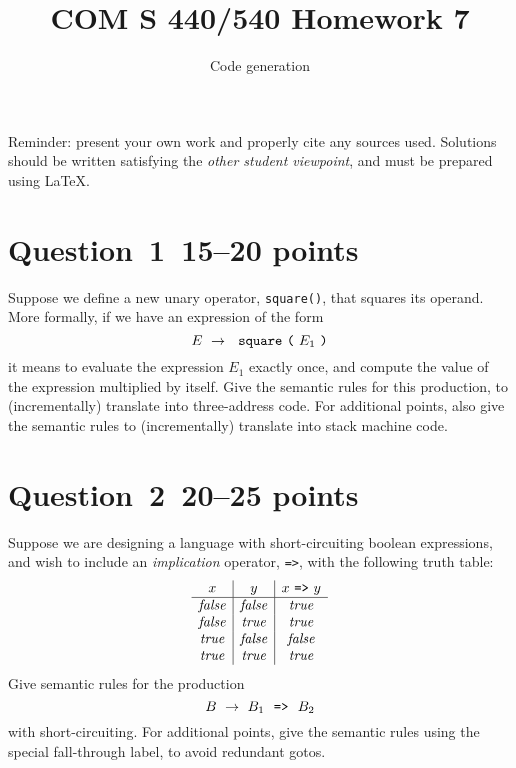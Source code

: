 \documentclass[10pt]{article}
\title{COM S 440/540 Homework 7}
\date{}
\author{Code generation}
\renewcommand{\thepage}{~}
\begin{document}
\maketitle

\noindent
Reminder: present your own work and properly cite any sources used.
Solutions should be written satisfying the \emph{other student viewpoint},
and must be prepared using \LaTeX.
\renewcommand{\thepage}{~}
\section*{Question~1~\hfill 15--20 points}

Suppose we define a new unary operator, \verb|square()|,
that squares its operand.
More formally, if we have an expression of the form
\[
E ~\rightarrow~~\verb|square|~\verb|(|~ E_1 ~\verb|)|
\]
it means to evaluate the expression $E_1$ exactly once,
and compute the value of the expression multiplied by itself.
Give the semantic rules for this production,
to (incrementally) translate into three-address code.
For additional points, also give the semantic rules
to (incrementally) translate into stack machine code.

\section*{Question~2~\hfill 20--25 points}

Suppose we are designing a language with short-circuiting
boolean expressions,
and wish to include an \emph{implication} operator, \verb|=>|,
with the following truth table:
\[
  \begin{array}{c|c|c}
    x & y & x ~\verb|=>|~ y
  \\ \hline
    \mathit{false} & \mathit{false} & \mathit{true}
  \\
    \mathit{false} & \mathit{true} & \mathit{true}
  \\
    \mathit{true} & \mathit{false} & \mathit{false}
  \\
    \mathit{true} & \mathit{true} & \mathit{true}
  \end{array}
\]
Give semantic rules
for the production
\[
  B ~\rightarrow~ B_1 ~~\verb|=>|~~ B_2
\]
with short-circuiting.
For additional points,
give the semantic rules using the special fall-through label,
to avoid redundant gotos.
\end{document}
